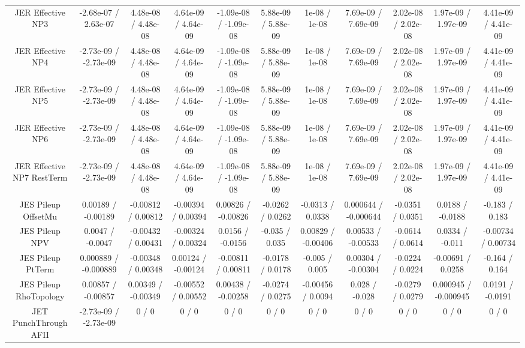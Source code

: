 {\begin{landscape}
\begin{longtable}{@{\extracolsep{\fill}}| *{11}{c|}}
  JER Effective NP3 & -2.68e-07 / 2.63e-07 & 4.48e-08 / 4.48e-08 & 4.64e-09 / 4.64e-09 & -1.09e-08 / -1.09e-08 & 5.88e-09 / 5.88e-09 & 1e-08 / 1e-08 & 7.69e-09 / 7.69e-09 & 2.02e-08 / 2.02e-08 & 1.97e-09 / 1.97e-09 & 4.41e-09 / 4.41e-09 \\ 
  JER Effective NP4 & -2.73e-09 / -2.73e-09 & 4.48e-08 / 4.48e-08 & 4.64e-09 / 4.64e-09 & -1.09e-08 / -1.09e-08 & 5.88e-09 / 5.88e-09 & 1e-08 / 1e-08 & 7.69e-09 / 7.69e-09 & 2.02e-08 / 2.02e-08 & 1.97e-09 / 1.97e-09 & 4.41e-09 / 4.41e-09 \\ 
  JER Effective NP5 & -2.73e-09 / -2.73e-09 & 4.48e-08 / 4.48e-08 & 4.64e-09 / 4.64e-09 & -1.09e-08 / -1.09e-08 & 5.88e-09 / 5.88e-09 & 1e-08 / 1e-08 & 7.69e-09 / 7.69e-09 & 2.02e-08 / 2.02e-08 & 1.97e-09 / 1.97e-09 & 4.41e-09 / 4.41e-09 \\ 
  JER Effective NP6 & -2.73e-09 / -2.73e-09 & 4.48e-08 / 4.48e-08 & 4.64e-09 / 4.64e-09 & -1.09e-08 / -1.09e-08 & 5.88e-09 / 5.88e-09 & 1e-08 / 1e-08 & 7.69e-09 / 7.69e-09 & 2.02e-08 / 2.02e-08 & 1.97e-09 / 1.97e-09 & 4.41e-09 / 4.41e-09 \\ 
  JER Effective NP7 RestTerm & -2.73e-09 / -2.73e-09 & 4.48e-08 / 4.48e-08 & 4.64e-09 / 4.64e-09 & -1.09e-08 / -1.09e-08 & 5.88e-09 / 5.88e-09 & 1e-08 / 1e-08 & 7.69e-09 / 7.69e-09 & 2.02e-08 / 2.02e-08 & 1.97e-09 / 1.97e-09 & 4.41e-09 / 4.41e-09 \\ 
  JES Pileup OffsetMu & 0.00189 / -0.00189 & -0.00812 / 0.00812 & -0.00394 / 0.00394 & 0.00826 / -0.00826 & -0.0262 / 0.0262 & -0.0313 / 0.0338 & 0.000644 / -0.000644 & -0.0351 / 0.0351 & 0.0188 / -0.0188 & -0.183 / 0.183 \\ 
  JES Pileup NPV & 0.0047 / -0.0047 & -0.00432 / 0.00431 & -0.00324 / 0.00324 & 0.0156 / -0.0156 & -0.035 / 0.035 & 0.00829 / -0.00406 & 0.00533 / -0.00533 & -0.0614 / 0.0614 & 0.0334 / -0.011 & -0.00734 / 0.00734 \\ 
  JES Pileup PtTerm & 0.000889 / -0.000889 & -0.00348 / 0.00348 & 0.00124 / -0.00124 & -0.00811 / 0.00811 & -0.0178 / 0.0178 & -0.005 / 0.005 & 0.00304 / -0.00304 & -0.0224 / 0.0224 & -0.00691 / 0.0258 & -0.164 / 0.164 \\ 
  JES Pileup RhoTopology & 0.00857 / -0.00857 & 0.00349 / -0.00349 & -0.00552 / 0.00552 & 0.00438 / -0.00258 & -0.0274 / 0.0275 & -0.00456 / 0.0094 & 0.028 / -0.028 & -0.0279 / 0.0279 & 0.000945 / -0.000945 & 0.0191 / -0.0191 \\ 
  JET PunchThrough AFII & -2.73e-09 / -2.73e-09 & 0 / 0 & 0 / 0 & 0 / 0 & 0 / 0 & 0 / 0 & 0 / 0 & 0 / 0 & 0 / 0 & 0 / 0 \\ 

\end{longtable}
\end{landscape}}
